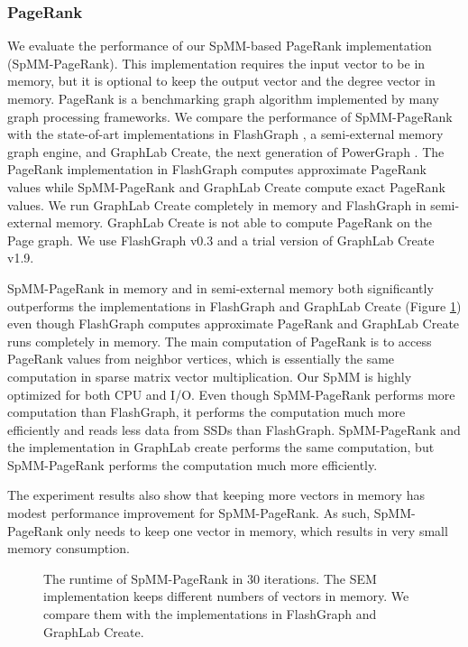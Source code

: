 \subsubsection{PageRank}
We evaluate the performance of our SpMM-based PageRank implementation
(SpMM-PageRank). This implementation requires the input vector to be in memory,
but it is optional to keep the output vector and the degree vector in memory.
PageRank is a benchmarking graph algorithm implemented by many graph processing
frameworks. We compare the performance of SpMM-PageRank with the state-of-art
implementations in FlashGraph \cite{flashgraph}, a semi-external memory graph
engine, and GraphLab Create, the next generation of PowerGraph \cite{powergraph}.
The PageRank implementation in FlashGraph computes
approximate PageRank values while SpMM-PageRank and GraphLab Create compute
exact PageRank values. We run GraphLab Create completely in memory and
FlashGraph in semi-external memory. GraphLab Create is not able to compute
PageRank on the Page graph. We use FlashGraph v0.3 and a trial version of
GraphLab Create v1.9.

SpMM-PageRank in memory and in semi-external memory both significantly outperforms
the implementations in FlashGraph and GraphLab Create (Figure \ref{perf:pagerank})
even though FlashGraph computes approximate PageRank and GraphLab Create runs
completely in memory. The main computation of PageRank is to access PageRank
values from neighbor vertices, which is essentially the same computation in
sparse matrix vector multiplication. Our SpMM is highly optimized for both CPU
and I/O. Even though SpMM-PageRank performs more computation than FlashGraph,
it performs the computation much more efficiently and
reads less data from SSDs than FlashGraph. SpMM-PageRank and the implementation
in GraphLab create performs the same computation, but SpMM-PageRank
performs the computation much more efficiently.

The experiment results also show that keeping more vectors in memory has modest
performance improvement for SpMM-PageRank. As such, SpMM-PageRank only needs
to keep one vector in memory, which results in very small memory consumption.

\begin{figure}
	\begin{center}
		\footnotesize
		
		\caption{The runtime of SpMM-PageRank in 30 iterations. The SEM
			implementation keeps different numbers of vectors in memory.
			We compare them with the implementations in FlashGraph and GraphLab
		Create.}
		\label{perf:pagerank}
	\end{center}
\end{figure}

